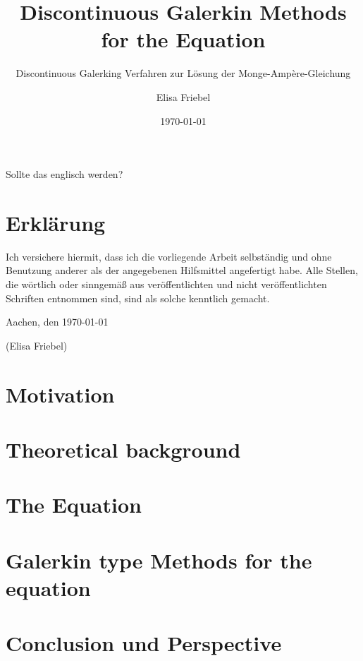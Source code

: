 \documentclass{template}
\title{Discontinuous Galerkin Methods for the \MA Equation}
\subtitle{\Large Discontinuous Galerking Verfahren zur Lösung der Monge-Amp\`ere-Gleichung}
\author{Elisa Friebel} %
\date{\today}
\begin{document}
\maketitle

\begin{center}
\begin{minipage}[t]{0.8\textwidth}

Sollte das englisch werden?
\chapter*{Erklärung}
Ich versichere hiermit, dass ich die vorliegende Arbeit selbständig und
ohne Benutzung anderer als der angegebenen Hilfsmittel angefertigt habe.
Alle Stellen, die wörtlich oder sinngemäß aus veröffentlichten und nicht
veröffentlichten Schriften entnommen sind, sind als solche kenntlich
gemacht.

\vspace{1cm}
Aachen, den \today

\vspace{2cm}
(Elisa Friebel)
\end{minipage}
\end{center}
\thispagestyle{empty}
\cleardoublepage

\tableofcontents{}

\setcounter{page}{1}


\chapter{Motivation}
\label{ch:leitung}

\chapter{Theoretical background}
\label{ch:TheoreticalBackground}



\chapter{The \MA Equation}
\label{ch:MongeAmpereEq}



\chapter{Galerkin type Methods for the \MA equation}
\label{ch:DGMongeAmpere}


\chapter{Conclusion und Perspective}
\label{ch:conclusion}


\newpage
%
\newpage


\end{document}

